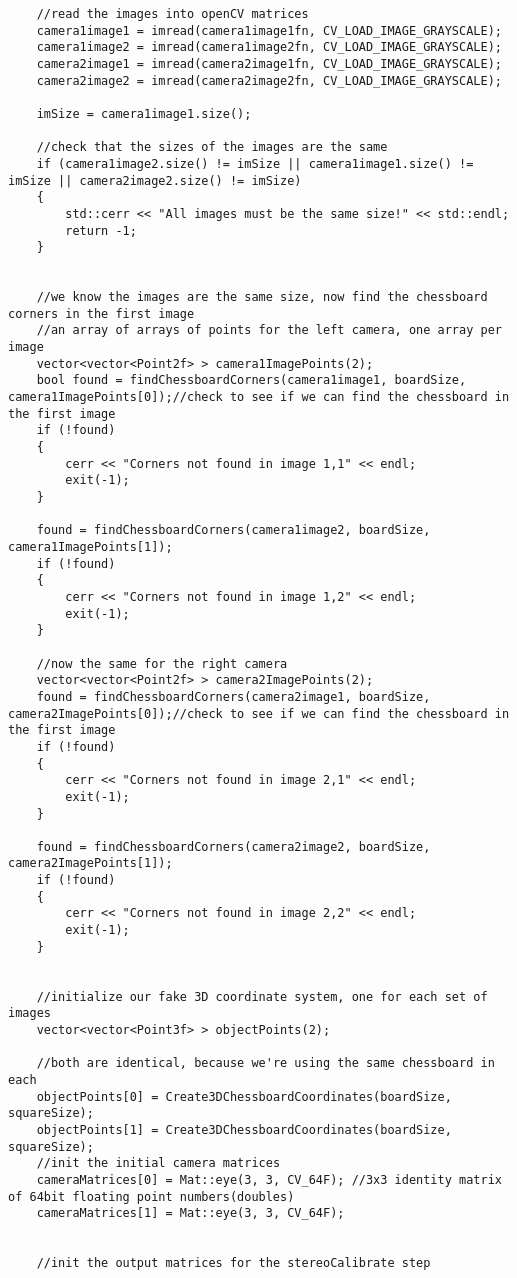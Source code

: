 \begin{verbatim}
	//read the images into openCV matrices
	camera1image1 = imread(camera1image1fn, CV_LOAD_IMAGE_GRAYSCALE);
	camera1image2 = imread(camera1image2fn, CV_LOAD_IMAGE_GRAYSCALE);
	camera2image1 = imread(camera2image1fn, CV_LOAD_IMAGE_GRAYSCALE);
	camera2image2 = imread(camera2image2fn, CV_LOAD_IMAGE_GRAYSCALE);

	imSize = camera1image1.size();

	//check that the sizes of the images are the same
	if (camera1image2.size() != imSize || camera1image1.size() != imSize || camera2image2.size() != imSize)
	{
		std::cerr << "All images must be the same size!" << std::endl;
		return -1;
	}


	//we know the images are the same size, now find the chessboard corners in the first image
	//an array of arrays of points for the left camera, one array per image
	vector<vector<Point2f> > camera1ImagePoints(2);
	bool found = findChessboardCorners(camera1image1, boardSize, camera1ImagePoints[0]);//check to see if we can find the chessboard in the first image
	if (!found)
	{
		cerr << "Corners not found in image 1,1" << endl;
		exit(-1);
	}

	found = findChessboardCorners(camera1image2, boardSize, camera1ImagePoints[1]);
	if (!found)
	{
		cerr << "Corners not found in image 1,2" << endl;
		exit(-1);
	}

	//now the same for the right camera
	vector<vector<Point2f> > camera2ImagePoints(2);
	found = findChessboardCorners(camera2image1, boardSize, camera2ImagePoints[0]);//check to see if we can find the chessboard in the first image
	if (!found)
	{
		cerr << "Corners not found in image 2,1" << endl;
		exit(-1);
	}

	found = findChessboardCorners(camera2image2, boardSize, camera2ImagePoints[1]);
	if (!found)
	{
		cerr << "Corners not found in image 2,2" << endl;
		exit(-1);
	}


	//initialize our fake 3D coordinate system, one for each set of images
	vector<vector<Point3f> > objectPoints(2);

	//both are identical, because we're using the same chessboard in each
	objectPoints[0] = Create3DChessboardCoordinates(boardSize, squareSize);
	objectPoints[1] = Create3DChessboardCoordinates(boardSize, squareSize);
	//init the initial camera matrices
	cameraMatrices[0] = Mat::eye(3, 3, CV_64F); //3x3 identity matrix of 64bit floating point numbers(doubles)
	cameraMatrices[1] = Mat::eye(3, 3, CV_64F);


	//init the output matrices for the stereoCalibrate step



\end{verbatim}
